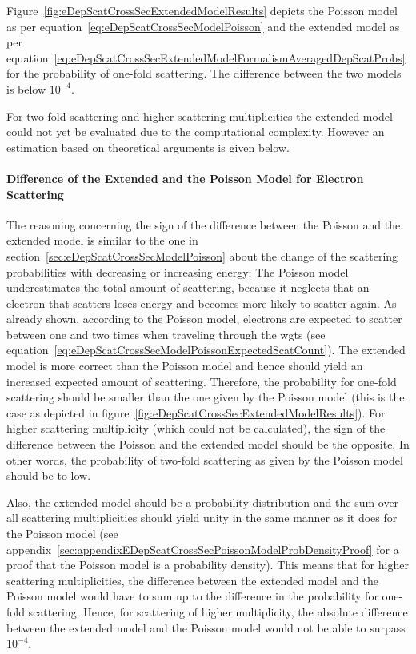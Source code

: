 Figure~\ref{fig:eDepScatCrossSecExtendedModelResults} depicts the Poisson model as per equation~\eqref{eq:eDepScatCrossSecModelPoisson} and the extended model as per equation~\eqref{eq:eDepScatCrossSecExtendedModelFormalismAveragedDepScatProbs} for the probability of one-fold scattering. The difference between the two models is below $10^{-4}$.

For two-fold scattering and higher scattering multiplicities the extended model could not yet be evaluated due to the computational complexity. However an estimation based on theoretical arguments is given below.

\paragraph{Difference of the Extended and the Poisson Model for Electron Scattering}
The reasoning concerning the sign of the difference between the Poisson and the extended model is similar to the one in section~\ref{sec:eDepScatCrossSecModelPoisson} about the change of the scattering probabilities with decreasing or increasing energy: The Poisson model underestimates the total amount of scattering, because it neglects that an electron that scatters loses energy and becomes more likely to scatter again. As already shown, according to the Poisson model, electrons are expected to scatter between one and two times when traveling through the \gls{wgts} (see equation~\ref{eq:eDepScatCrossSecModelPoissonExpectedScatCount}). The extended model is more correct than the Poisson model and hence should yield an increased expected amount of scattering. Therefore, the probability for one-fold scattering should be smaller than the one given by the Poisson model (this is the case as depicted in figure~\ref{fig:eDepScatCrossSecExtendedModelResults}). For higher scattering multiplicity (which could not be calculated), the sign of the difference between the Poisson and the extended model should be the opposite. In other words, the probability of two-fold scattering as given by the Poisson model should be to low.

Also, the extended model should be a probability distribution and the sum over all scattering multiplicities should yield unity in the same manner as it does for the Poisson model (see appendix~\ref{sec:appendixEDepScatCrossSecPoissonModelProbDensityProof} for a proof that the Poisson model is a probability density). This means that for higher scattering multiplicities, the difference between the extended model and the Poisson model would have to sum up to the difference in the probability for one-fold scattering. Hence, for scattering of higher multiplicity, the absolute difference between the extended model and the Poisson model would not be able to surpass $10^{-4}$.

